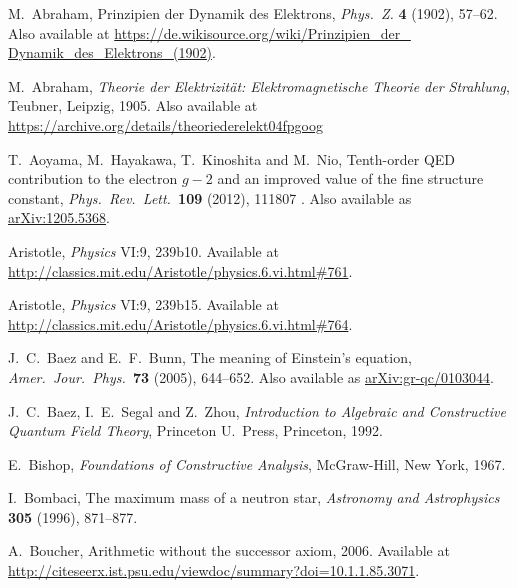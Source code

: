 \documentclass{article}
\begin{document}
\begin{thebibliography}{10}

 M.\ Abraham, Prinzipien der Dynamik des Elektrons, \textsl{Phys.\ Z.} \textbf{4} (1902), 57--62.  Also available at \href{https://de.wikisource.org/wiki/Prinzipien_der_Dynamik_des_Elektrons_\%281902\%29}{https://de.wikisource.org/wiki/Prinzipien\_der\_ \hfill \break Dynamik\_des\_Elektrons\_(1902)}.

 M.\ Abraham, \textsl{Theorie der Elektrizit\"at: Elektromagnetische Theorie der Strahlung}, Teubner, Leipzig, 1905.  Also available at 
\href{https://archive.org/details/theoriederelekt04fpgoog}{https://archive.org/details/theoriederelekt04fpgoog}

 T.\ Aoyama, M.\ Hayakawa, T.\ Kinoshita and M.\ Nio, Tenth-order QED contribution to the electron $g−2$ and an improved value of the fine structure constant, \textsl{Phys.\ Rev.\ Lett.\ }\textbf{109} (2012), 111807 . Also available as \href{http://arxiv.org/abs/1205.5368}{arXiv:1205.5368}.

 Aristotle, \textsl{Physics} VI:9, 239b10.  Available at  \href{http://classics.mit.edu/Aristotle/physics.6.vi.html\#761}{http://classics.mit.edu/\break Aristotle/physics.6.vi.html\#761}.
 
 Aristotle, \textsl{Physics} VI:9, 239b15.  Available at \href{http://classics.mit.edu/Aristotle/physics.6.vi.html\#764}{http://classics.mit.edu/\break Aristotle/physics.6.vi.html\#764}.

 J.\ C.\ Baez and E.\ F.\ Bunn, The meaning of Einstein's equation, \textsl{Amer.\ Jour.\ Phys.\ }\textbf{73} (2005), 644--652.   Also available as \href{http://arxiv.org/abs/gr-qc/0103044}{arXiv:gr-qc/0103044}.
 
 J.\ C.\ Baez, I.\ E.\ Segal and Z.\ Zhou, \textsl{Introduction to 
Algebraic and Constructive Quantum Field Theory}, Princeton U.\ Press, Princeton, 1992.

 E.\ Bishop, \textsl{Foundations of Constructive Analysis}, McGraw-Hill, New York, 1967.

 I.\ Bombaci, The maximum mass of a neutron star, \textsl{ Astronomy and Astrophysics} \textbf{305} (1996), 871--877.

 A.\ Boucher, Arithmetic without the successor axiom, 2006.
Available at \href{http://citeseerx.ist.psu.edu/viewdoc/summary?doi=10.1.1.85.3071}{http://citeseerx.ist.psu.edu/viewdoc/summary?doi=10.1.1.85.3071}.


\end{thebibliography}
\end{document}
